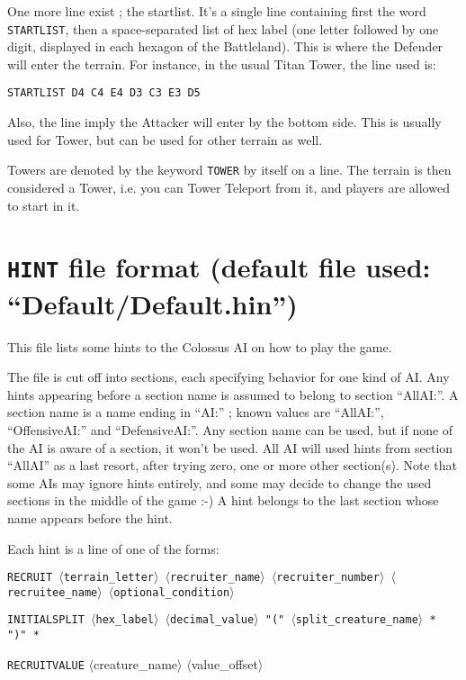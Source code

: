 \documentclass{article}
\begin{document}
One more line exist ; the startlist. It's a single line containing first the word \texttt{STARTLIST}, then a space-separated list of hex label (one letter followed by one digit, displayed in each hexagon of the Battleland). This is where the Defender will enter the terrain. For instance, in the usual Titan Tower, the line used is:

\texttt{STARTLIST D4 C4 E4 D3 C3 E3 D5}

Also, the line imply the Attacker will enter by the bottom side. This is usually used for Tower, but can be used for other terrain as well.

Towers are denoted by the keyword \texttt{TOWER} by itself on a line. The terrain is then considered a Tower, i.e. you can Tower Teleport from it, and players are allowed to start in it.

\section{\texttt{HINT} file format (default file used: ``Default/Default.hin'')}

This file lists some hints to the Colossus AI on how to play the game.

The file is cut off into sections, each specifying behavior for one kind of AI. Any hints appearing before a section name is assumed to belong to section ``AllAI:''. A section name is a name ending in ``AI:'' ; known values are ``AllAI:'', ``OffensiveAI:'' and ``DefensiveAI:''. Any section name can be used, but if none of the AI is aware of a section, it won't be used. All AI will used hints from section ``AllAI'' as a last resort, after trying zero, one or more other section(s). Note that some AIs may ignore hints entirely, and some may decide to change the used sections in the middle of the game :-) A hint belongs to the last section whose name appears before the hint.

Each hint is a line of one of the forms:

\texttt{RECRUIT $\langle$terrain\_letter$\rangle$ $\langle$recruiter\_name$\rangle$ $\langle$recruiter\_number$\rangle$  $\langle$recruitee\_name$\rangle$ $\langle$optional\_condition$\rangle$}

\texttt{INITIALSPLIT $\langle$hex\_label$\rangle$ $\langle$decimal\_value$\rangle$ "(" $\langle$split\_creature\_name$\rangle$ * ")" *}

\texttt{RECRUITVALUE} $\langle$creature\_name$\rangle$ $\langle$value\_offset$\rangle$
\end{document}
